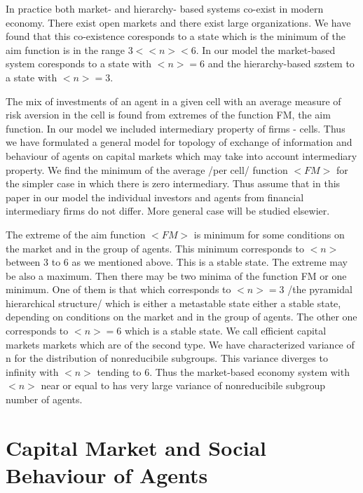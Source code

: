 \documentclass[10pt]{article}
\begin{document}




In practice both market- and hierarchy- based systems co-exist in modern economy. There exist open markets and there exist large organizations.
We have found that this co-existence coresponds to a state which is the minimum of the aim function is in the range $ 3 < <n> <6$. In our model the market-based system coresponds to a state with $<n> = 6$ and the hierarchy-based szstem to a state with $<n> = 3$.

The mix of investments of an agent in a given cell with an average measure of risk aversion in the cell is found from
extremes of the function FM, the aim function. In our model we included intermediary property of firms - cells. Thus we have formulated a general model for topology of exchange of information and behaviour of agents on capital markets which may take into account intermediary property. We find the minimum of the average  /per cell/ function $<FM>$ for the simpler case in which there is zero intermediary. Thus assume that in this paper in our model the individual investors and agents from financial intermediary firms do not differ. More general case will be studied elsewier.

The extreme of the aim function $<FM>$ is minimum for some conditions on the market and in the group of agents. This minimum corresponds to $<n>$ between 3 to 6 as we mentioned above.
This is a stable state. The extreme may be also a maximum. Then there may be two minima of the function FM or one minimum. One of them is that which corresponds to $<n> = 3$ /the pyramidal hierarchical structure/ which is either a metastable state either a stable state,
depending on conditions on the market and in the group of agents.
 The other one corresponds to $<n> = 6$  which is a stable state. We call efficient capital markets markets which are of the second type. We have characterized variance of n for the distribution of nonreducibile subgroups. This variance diverges to infinity with $<n>$ tending to 6. Thus the market-based economy system with $ <n> $ near 
   or equal to has very large variance of nonreducibile subgroup number of agents.
   
   
   
\section{Capital Market and Social Behaviour of Agents}
\end{document}
